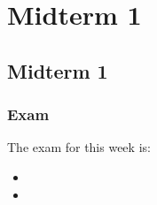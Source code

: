 \clearpage

\renewcommand{\ChapTitle}{Midterm 1}
\renewcommand{\SectionTitle}{Midterm 1}

\chapter{\ChapTitle}

\section{\SectionTitle}

\subsection{Exam}

The exam for this week is:

\begin{itemize}
    \item {}
    \item {}
\end{itemize}